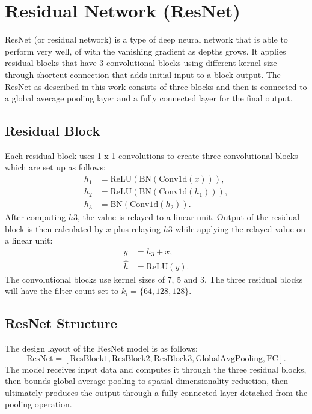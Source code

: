 \documentclass[12pt]{article}
\begin{document}
\section{Residual Network (ResNet)}\label{sec:intro}
ResNet (or residual network) is a type of deep neural network that is able to perform very well, of with the vanishing gradient as depths grows. It applies residual blocks that have 3 convolutional blocks using different kernel size through shortcut connection that adds initial input to a block output. The ResNet as described in this work consists of three blocks and then is connected to a global average pooling layer and a fully connected layer for the final output.~\cite{chen2023}

\subsection{Residual Block}\label{subsec:resblock}
Each residual block uses 1 x 1 convolutions to create three convolutional blocks which are set up as follows:
\begin{align}
h_1 &= \text{ReLU}(\text{BN}(\text{Conv1d}(x))), \label{eq:h1} \\
h_2 &= \text{ReLU}(\text{BN}(\text{Conv1d}(h_1))), \label{eq:h2} \\
h_3 &= \text{BN}(\text{Conv1d}(h_2)). \label{eq:h3}
\end{align}
After computing \(h3\), the value is relayed to a linear unit. Output of the residual block is then calculated by \(x\) plus relaying \(h3\) while applying the relayed value on a linear unit:
\begin{align}
y &= h_3 + x, \label{eq:y} \\
\hat{h} &= \text{ReLU}(y). \label{eq:hhat}
\end{align}
The convolutional blocks use kernel sizes of 7, 5 and 3. The three residual blocks will have the filter count set to \( k_i = \{64, 128, 128\} \).

\subsection{ResNet Structure}\label{subsec:resnet}
The design layout of the ResNet model is as follows:
\[
\text{ResNet} = [\text{ResBlock1}, \text{ResBlock2}, \text{ResBlock3}, \text{GlobalAvgPooling}, \text{FC}].
\]
The model receives input data and computes it through the three residual blocks, then bounds global average pooling to spatial dimensionality reduction, then ultimately produces the output through a fully connected layer detached from the pooling operation.
\end{document}

